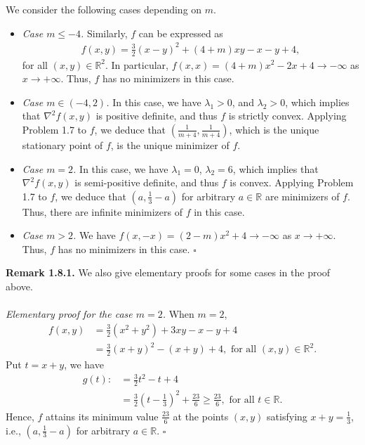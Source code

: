 \documentclass[a4paper]{article}
\numberwithin{equation}{section}
\begin{document}
We consider the following cases depending on $m$.
\begin{itemize}
\item \textit{Case $m\le -4$.} Similarly, $f$ can be expressed as
\begin{align}
f\left( {x,y} \right) = \frac{3}{2}{\left( {x - y} \right)^2} + \left( {4 + m} \right)xy - x - y + 4,
\end{align}
for all $\left( {x,y} \right) \in {\mathbb{R}^2}$. In particular, $f\left( {x,x} \right) = \left( {4 + m} \right){x^2} - 2x + 4 \to  - \infty$ as $x \to  + \infty $. Thus, $f$ has no minimizers in this case.

\item \textit{Case $m\in \left(-4,2\right)$.} In this case, we have $\lambda _1>0$, and $\lambda _2 >0$, which implies that ${\nabla ^2}f\left( {x,y} \right)$ is positive definite, and thus $f$ is strictly convex. Applying Problem 1.7 to $f$, we deduce that $\left(\frac{1}{m+4},\frac{1}{m+4}\right)$, which is the unique stationary point of $f$, is the unique minimizer of $f$.
\item \textit{Case $m=2$.} In this case, we have $\lambda _1 =0$, $\lambda _2 =6$, which implies that ${\nabla ^2}f\left( {x,y} \right)$ is semi-positive definite, and thus $f$ is convex. Applying Problem 1.7 to $f$, we deduce that $\left(a,\frac{1}{3}-a\right)$ for arbitrary $a\in \mathbb{R}$ are minimizers of $f$. Thus, there are infinite minimizers of $f$ in this case.
\item \textit{Case $m>2$.} We have $f\left( {x, - x} \right) = \left( {2 - m} \right){x^2} + 4 \to  - \infty$ as $x \to  + \infty $. Thus, $f$ has no minimizers in this case. \hfill $\square$
\end{itemize}
\textbf{Remark 1.8.1.} We also give elementary proofs for some cases in the proof above.\\
\\
\textit{Elementary proof for the case $m=2$.} When $m=2$, 
\begin{align}
f\left( {x,y} \right) &= \frac{3}{2}\left( {{x^2} + {y^2}} \right) + 3xy - x - y + 4\\
 &= \frac{3}{2}{\left( {x + y} \right)^2} - \left( {x + y} \right) + 4,\mbox{ for all } \left( {x,y} \right) \in {\mathbb{R}^2}.
\end{align}
Put $t=x+y$, we have
\begin{align}
g\left( t \right): &= \frac{3}{2}{t^2} - t + 4\\
 &= \frac{3}{2}{\left( {t - \frac{1}{3}} \right)^2} + \frac{{23}}{6} \ge \frac{{23}}{6}, \mbox{ for all } t \in \mathbb{R}.
\end{align}
Hence, $f$ attains its minimum value $\frac{23}{6}$ at the points $\left(x,y\right)$ satisfying $x+y=\frac{1}{3}$, i.e., $\left(a,\frac{1}{3}-a\right)$ for arbitrary $a\in \mathbb{R}$. \hfill $\square$\\
\end{document}

